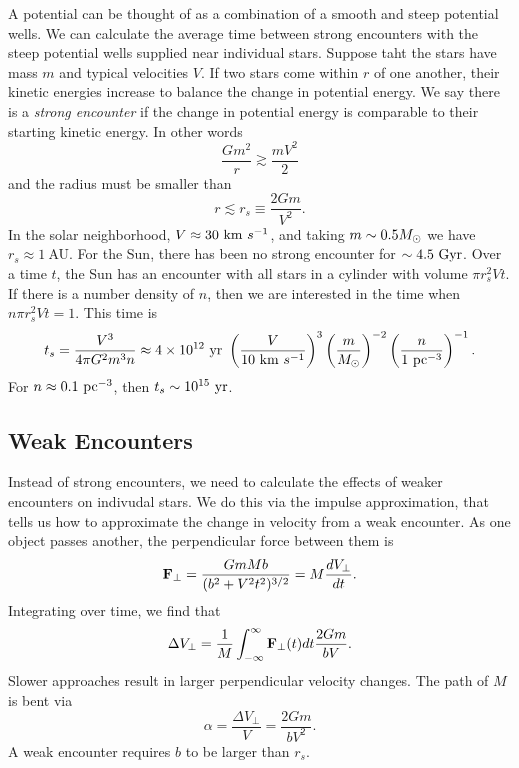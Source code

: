 \documentclass[]{article}
\begin{document}
A potential can be thought of as a combination of a smooth and steep potential wells.
We can calculate the average time between strong encounters with the steep
potential wells supplied near individual stars. Suppose taht the
stars have mass $m$ and typical velocities $V$. If two stars come
within $r$ of one another, their kinetic energies increase to balance the
change in potential energy.  We say there is a {\it strong encounter}
if the change in potential energy is comparable to their starting
kinetic energy.  In other words
\begin{equation}
\frac{Gm^{2}}{r} \gtrsim \frac{mV^{2}}{2}
\end{equation}
\noindent
and the radius must be smaller than
\begin{equation}
r \lesssim r_{s} \equiv \frac{2Gm}{V^2}.
\end{equation}
\noindent
In the solar neighborhood, $V\approx30~\mathrm{km}~s^{-1}$, and taking $m\sim0.5M_{\odot}$ we have $r_s \approx 1~$AU.
For the Sun, there has been no strong encounter for $\sim4.5~\mathrm{Gyr}$. Over a time $t$, the Sun
has an encounter with all stars in a cylinder with volume $\pi r_s^2 V t$. If there is a number
density of $n$, then we are interested in the time when $n\pi r_s^2 V t = 1$.  This time is
\begin{equation}
t_s = \frac{V^3}{4\pi G^2 m^3 n} \approx 4 \times 10^{12}~\mathrm{yr}~\left(\frac{V}{10~\mathrm{km}~s^{-1}}\right)^3\left(\frac{m}{M_{\odot}}\right)^{-2}\left(\frac{n}{1~\mathrm{pc}^{-3}}\right)^{-1}.
\end{equation}
\noindent
For $n\approx0.1~\mathrm{pc}^{-3}$, then $t_s\sim10^{15}~\mathrm{yr}$.


\subsection{Weak Encounters}

Instead of strong encounters, we need to calculate the effects of weaker encounters
on indivudal stars.  We do this via the impulse approximation, that tells us how to
approximate the change in velocity from a weak encounter.  As one object passes
another, the perpendicular force between them is
\begin{equation}
\mathbf{F}_{\perp} = \frac{GmMb}{(b^2 + V^2t^2)^{3/2}} = M \frac{dV_{\perp}}{dt}.
\end{equation}
\noindent
Integrating over time, we find that
\begin{equation}
\Delta V_{\perp} = \frac{1}{M} \int_{-\infty}^{\infty} \mathbf{F}_{\perp}(t) dt \frac{2 G m}{bV}.
\end{equation}
Slower approaches result in larger perpendicular velocity changes. The
path of $M$ is bent via
\begin{equation}
\alpha = \frac{\Delta V_{\perp}}{V} = \frac{2Gm}{bV^2}.
\end{equation}
\noindent
A weak encounter requires $b$ to be larger than $r_s$.
\end{document}
